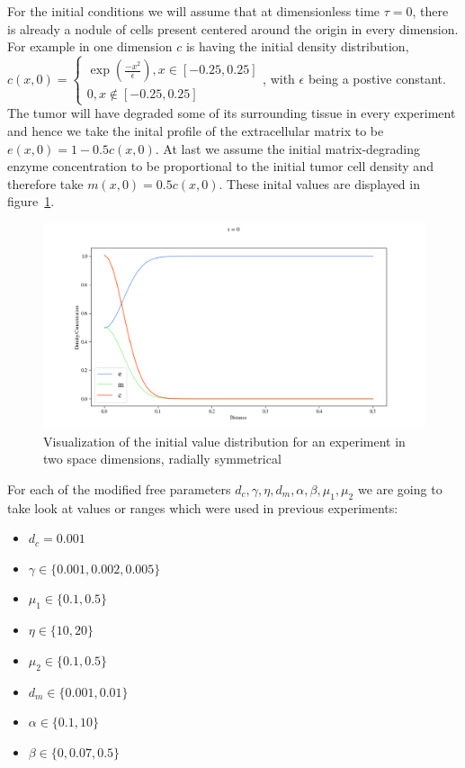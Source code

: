 For the initial conditions we will assume that at dimensionless time $\tau = 0$, there is already a nodule of cells present centered around the origin in every dimension. For example in one dimension $c$ is having the initial density distribution, 
$c(x,0)=
\begin{cases}
\exp(\frac{-x^2}{\epsilon}), x\in [-0.25, 0.25]\\
0, x\notin [-0.25,0.25]
\end{cases}
$, with $\epsilon$ being a postive constant. 
The tumor will have degraded some of its surrounding tissue in every experiment and hence we take the inital profile of the extracellular matrix to be $e(x,0) = 1 - 0.5 c(x,0)$. At last we assume the initial matrix-degrading enzyme concentration to be proportional to the initial tumor cell density and therefore take $m(x,0) = 0.5 c(x,0)$. These inital values are displayed in figure~\ref{fig:Initial_Value_Distribution}.
\begin{figure}
    \centering
    \label{fig:Initial_Value_Distribution}
    \includegraphics[width=\textwidth]{resources/images/inital_value_plot_figure.png}
    \caption{Visualization of the initial value distribution for an experiment in two space dimensions, radially symmetrical}
\end{figure}

For each of the modified free parameters $d_c, \gamma, \eta, d_m, \alpha, \beta, \mu_1, \mu_2$ we are going to take look at values or ranges which were used in previous experiments: 
\begin{itemize}
    \item $d_c = 0.001$
    \item $\gamma \in \{0.001, 0.002, 0.005\}$
    \item $\mu_1 \in \{0.1, 0.5\}$
    \item $\eta \in \{10, 20\}$
    \item $\mu_2 \in \{0.1, 0.5\}$
    \item $d_m \in \{0.001, 0.01\}$
    \item $\alpha \in \{0.1, 10\}$
    \item $\beta \in \{0, 0.07, 0.5\}$
\end{itemize}








